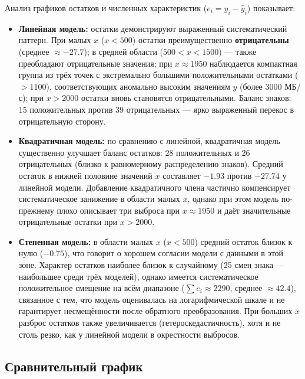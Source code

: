 Анализ графиков остатков и численных характеристик (\(e_i = y_i - \hat{y}_i\)) показывает:

\begin{itemize}
    \item \textbf{Линейная модель:} остатки демонстрируют выраженный систематический паттерн. При малых \(x\) (\(x < 500\)) остатки преимущественно \textbf{отрицательны} (среднее \(\approx -27.7\)); в средней области (\(500 < x < 1500\)) — также преобладают отрицательные значения; при \(x \approx 1950\) наблюдается компактная группа из трёх точек с экстремально большими положительными остатками (\(>1100\)), соответствующих аномально высоким значениям \(y\) (более 3000 МБ/с); при \(x > 2000\) остатки вновь становятся отрицательными. Баланс знаков: 15 положительных против 39 отрицательных — ярко выраженный перекос в отрицательную сторону.

    \item \textbf{Квадратичная модель:} по сравнению с линейной, квадратичная модель существенно улучшает баланс остатков: 28 положительных и 26 отрицательных (близко к равномерному распределению знаков). Средний остаток в нижней половине значений \(x\) составляет \(-1.93\) против \(-27.74\) у линейной модели. Добавление квадратичного члена частично компенсирует систематическое занижение в области малых \(x\), однако при этом модель по-прежнему плохо описывает три выброса при \(x \approx 1950\) и даёт значительные отрицательные остатки при \(x > 2000\).

    \item \textbf{Степенная модель:} в области малых \(x\) (\(x < 500\)) средний остаток близок к нулю (\(-0.75\)), что говорит о хорошем согласии модели с данными в этой зоне. Характер остатков наиболее близок к случайному (25 смен знака — наибольшее среди трёх моделей), однако имеется систематическое положительное смещение на всём диапазоне (\(\sum e_i \approx 2290\), среднее \(\approx 42.4\)), связанное с тем, что модель оценивалась на логарифмической шкале и не гарантирует несмещённости после обратного преобразования. При больших \(x\) разброс остатков также увеличивается (гетероскедастичность), хотя и не столь резко, как у линейной модели в окрестности выбросов.
\end{itemize}

\subsection{Сравнительный график}

